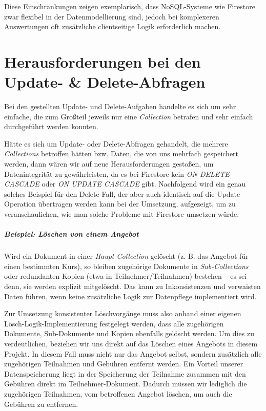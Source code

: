 \documentclass[12pt,a4paper%
              ,oneside     %
              ,titlepage
              ,DIV=13
              ,headinclude
              ,footinclude=false%
              ,cleardoublepage=empty%
              ,parskip=half,
              BCOR=0mm,
              ]{scrreprt}
\begin{document}
Diese Einschränkungen zeigen exemplarisch, dass NoSQL-Systeme wie Firestore zwar flexibel in der Datenmodellierung sind, jedoch bei komplexeren Auswertungen oft zusätzliche clientseitige Logik erforderlich machen.

\chapter{Herausforderungen bei den Update- \& Delete-Abfragen}
\label{update-delete-chapter}

Bei den gestellten Update- und Delete-Aufgaben handelte es sich um sehr einfache, die zum Großteil jeweils nur eine \textit{Collection} betrafen und sehr einfach durchgeführt werden konnten. 

Hätte es sich um Update- oder Delete-Abfragen gehandelt, die mehrere \textit{Collections} betroffen hätten bzw. Daten, die von uns mehrfach gespeichert werden, dann wären wir auf neue Herausforderungen gestoßen, um Datenintegrität zu gewährleisten, da es bei Firestore kein \textit{ON DELETE CASCADE} oder \textit{ON UPDATE CASCADE} gibt. Nachfolgend wird ein genau solches Beispiel für den Delete-Fall, der aber auch identisch auf die Update-Operation übertragen werden kann bei der Umsetzung, aufgezeigt, um zu veranschaulichen, wie man solche Probleme mit Firestore umsetzen würde.

\paragraph{\textbf{Beispiel}: Löschen von einem Angebot}
Wird ein Dokument in einer \textit{Haupt-Collection} gelöscht (z. B. das Angebot für einen bestimmten Kurs), so bleiben zugehörige Dokumente in \textit{Sub-Collections} oder redundanten Kopien (etwa in Teilnehmer/Teilnahmen) bestehen – es sei denn, sie werden explizit mitgelöscht. Das kann zu Inkonsistenzen und verwaisten Daten führen, wenn keine zusätzliche Logik zur Datenpflege implementiert wird.

Zur Umsetzung konsistenter Löschvorgänge muss also anhand einer eigenen Lösch-Logik-Implementierung festgelegt werden, dass alle zugehörigen Dokumente, Sub-Dokumente und Kopien ebenfalls gelöscht werden. Um dies zu verdeutlichen, beziehen wir uns direkt auf das Löschen eines Angebots in diesem Projekt. In diesem Fall muss nicht nur das Angebot selbst, sondern zusätzlich alle zugehörigen Teilnahmen und Gebühren entfernt werden.
Ein Vorteil unserer Datenspeicherung liegt in der Speicherung der Teilnahme zusammen mit den Gebühren direkt im Teilnehmer-Dokument. Dadurch müssen wir lediglich die zugehörigen Teilnahmen, vom betroffenen Angebot löschen, um auch die Gebühren zu entfernen.
\end{document}
